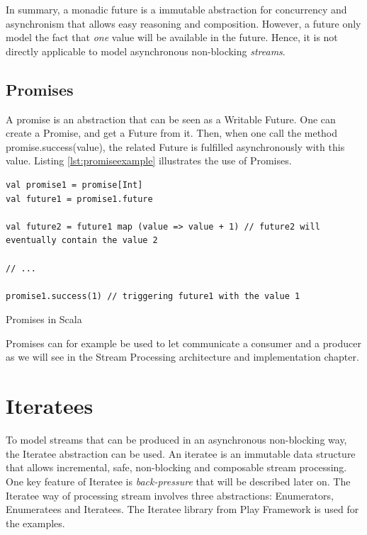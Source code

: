 In summary, a monadic future is a immutable abstraction for concurrency and asynchronism that allows easy reasoning and composition.
However, a future only model the fact that \textit{one} value will be available in the future. Hence, it is not directly applicable
to model asynchronous non-blocking \textit{streams}.

\subsection{Promises}
\label{sec:promises}
A promise is an abstraction that can be seen as a Writable Future. One can create a Promise, and get a Future from it. Then, when one call the method promise.success(value),
the related Future is fulfilled asynchronously with this value. Listing \ref{lst:promiseexample} illustrates the use of Promises. 

\begin{listing}[h]
\begin{verbatim}
val promise1 = promise[Int]
val future1 = promise1.future

val future2 = future1 map (value => value + 1) // future2 will eventually contain the value 2

// ...

promise1.success(1) // triggering future1 with the value 1
\end{verbatim}
\caption{Promises in Scala}
\label{lst:promiseexample}
\end{listing}

Promises can for example be used to let communicate a consumer and a producer as we will see in the Stream Processing architecture and implementation chapter.

\section{Iteratees}
\label{sec:iteratees}

To model streams that can be produced in an asynchronous non-blocking way, the Iteratee abstraction can be used. An iteratee is an immutable data structure
that allows incremental, safe, non-blocking and composable stream processing. One key feature of Iteratee is \textit{back-pressure} that will be described later on.
The Iteratee way of processing stream involves three abstractions: Enumerators, Enumeratees and Iteratees. The Iteratee library from Play Framework 
 is used for the examples.
\\

